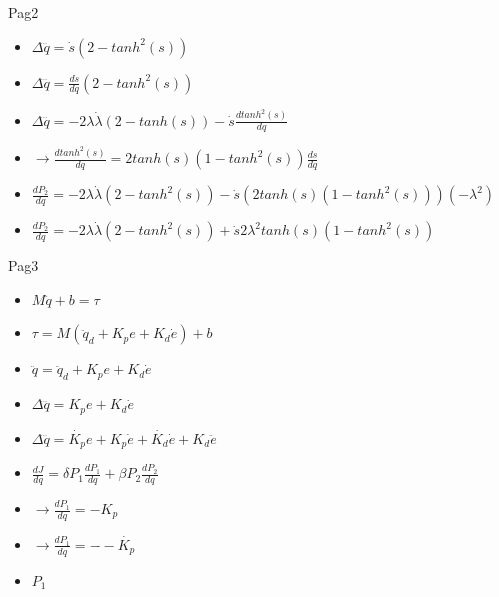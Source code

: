 \documentclass[10pt]{beamer}
\begin{document}
\begin{frame}[fragile]{Pag2}

\begin{itemize}
    \item $ \Delta \dddot{q} = \dot{s} (2 - tanh^2(s)) $
    \item $ \Delta \dddot{q} = \frac{d\dot{s}}{dq} (2 - tanh^2(s))$
    \item $ \Delta \dddot{q} = - 2 \lambda \dot{\lambda}(2 - tanh(s)) - \dot{s} \frac{d tanh^2(s)}{dq} $
    \item $ \rightarrow \frac{d tanh^2(s)}{dq} = 2 tanh(s) (1 - tanh^2(s) ) \frac{ds}{dq}  $
    \item $ \frac{dP_2}{dq} = -2 \lambda \dot{\lambda} (2 - tanh^2(s) )  - \dot{s} (2 tanh(s) (1 - tanh^2(s) ))( - \lambda^2) $
    \item $ \frac{dP_2}{dq} = -2 \lambda \dot{\lambda} (2 - tanh^2(s) )  + \dot{s} 2 \lambda^2 tanh(s)(1-tanh^2(s))$
\end{itemize}

\end{frame}

\begin{frame}[fragile]{Pag3}

\begin{itemize}
    \item $ M \ddot{q} + b = \tau $
    \item $ \tau = M ( \ddot{q}_d + K_p e + K_d \dot{e}) + b $
    \item $ \ddot{q } = \ddot{q}_d  + K_p e + K_d \dot{e} $
    \item $ \Delta \dddot{q} = K_p e + K_d \dot{e} $
    \item $ \Delta \dddot{q} = \dot{K_p} e + K_p \dot{e} + \dot{K_d} \dot{e} + K_d \ddot{e} $
    \item $\frac{dJ}{dq} = \delta P_1 \frac{dP_1}{dq} + \beta P_2 \frac{dP_2}{dq} $
    \item $ \rightarrow \frac{dP_1}{dq} = -K_p $
    \item $ \rightarrow \frac{dP_1}{dq} = - \dot{} - \dot{ K_p} $
    \item $  P_1 $
\end{itemize}

\end{frame}
\end{document}
